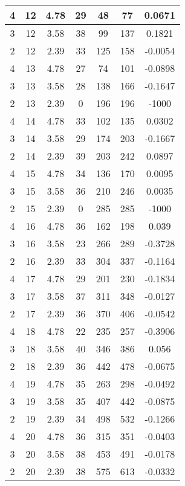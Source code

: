 \documentclass[letterpaper, 12pt]{article}
\begin{document}
\begin{longtable}{|c|c|c|c|c|c|c|}
\hline
4 & 12 & 4.78 & 29 & 48 & 77 & 0.0671 \\
\hline
3 & 12 & 3.58 & 38 & 99 & 137 & 0.1821 \\
\hline
2 & 12 & 2.39 & 33 & 125 & 158 & -0.0054 \\
\hline
4 & 13 & 4.78 & 27 & 74 & 101 & -0.0898 \\
\hline
3 & 13 & 3.58 & 28 & 138 & 166 & -0.1647 \\
\hline
2 & 13 & 2.39 & 0 & 196 & 196 & -1000 \\
\hline
4 & 14 & 4.78 & 33 & 102 & 135 & 0.0302 \\
\hline
3 & 14 & 3.58 & 29 & 174 & 203 & -0.1667 \\
\hline
2 & 14 & 2.39 & 39 & 203 & 242 & 0.0897 \\
\hline
4 & 15 & 4.78 & 34 & 136 & 170 & 0.0095 \\
\hline
3 & 15 & 3.58 & 36 & 210 & 246 & 0.0035 \\
\hline
2 & 15 & 2.39 & 0 & 285 & 285 & -1000 \\
\hline
4 & 16 & 4.78 & 36 & 162 & 198 & 0.039 \\
\hline
3 & 16 & 3.58 & 23 & 266 & 289 & -0.3728 \\
\hline
2 & 16 & 2.39 & 33 & 304 & 337 & -0.1164 \\
\hline
4 & 17 & 4.78 & 29 & 201 & 230 & -0.1834 \\
\hline
3 & 17 & 3.58 & 37 & 311 & 348 & -0.0127 \\
\hline
2 & 17 & 2.39 & 36 & 370 & 406 & -0.0542 \\
\hline
4 & 18 & 4.78 & 22 & 235 & 257 & -0.3906 \\
\hline
3 & 18 & 3.58 & 40 & 346 & 386 & 0.056 \\
\hline
2 & 18 & 2.39 & 36 & 442 & 478 & -0.0675 \\
\hline
4 & 19 & 4.78 & 35 & 263 & 298 & -0.0492 \\
\hline
3 & 19 & 3.58 & 35 & 407 & 442 & -0.0875 \\
\hline
2 & 19 & 2.39 & 34 & 498 & 532 & -0.1266 \\
\hline
4 & 20 & 4.78 & 36 & 315 & 351 & -0.0403 \\
\hline
3 & 20 & 3.58 & 38 & 453 & 491 & -0.0178 \\
\hline
2 & 20 & 2.39 & 38 & 575 & 613 & -0.0332 \\
\hline
\end{longtable}
\end{document}
